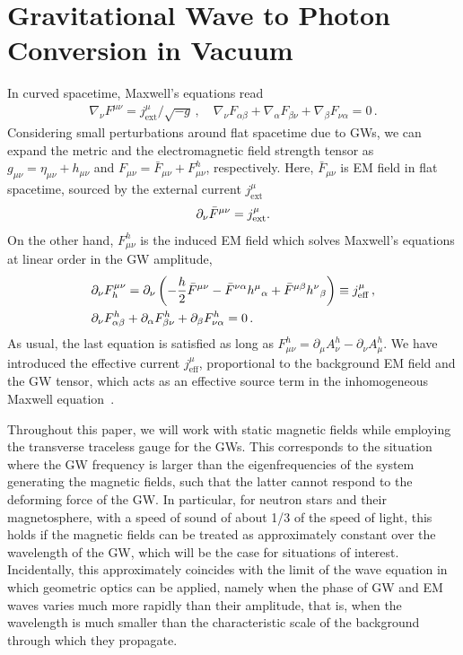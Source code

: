 \documentclass[a4paper,11pt]{article}
\begin{document}
\section{Gravitational Wave to Photon Conversion in Vacuum}
\label{sec:basics}

%
In curved spacetime, Maxwell's equations read~\cite{Landau:1975pou}
%
\begin{align}
 \nabla_{\nu} F^{\mu\nu} = j^\mu_\text{ext} /\sqrt{-g}\,, \quad \nabla_\nu F_{\alpha \beta} + \nabla_\alpha F_{\beta \nu} + \nabla_\beta F_{\nu \alpha} = 0 \,.
\end{align}
%
Considering small perturbations around flat spacetime due to GWs, we can expand the metric and the electromagnetic field strength tensor as $ g_{\mu\nu} = \eta_{\mu\nu} + h_{\mu\nu} $ and $ F_{\mu\nu} = \bar{F}_{\mu\nu} + F^{h}_{\mu\nu} $, respectively.
%
Here, $\bar{F}_{\mu\nu} $ is EM field in flat spacetime, sourced by the external current $j^\mu_\text{ext}$
%
\begin{align}
    \partial_{\nu} \bar{F}^{\mu\nu} = j_{\rm ext}^{\mu}.
\end{align}
%
On the other hand, $F^{h}_{\mu\nu}$ is the induced EM field which solves Maxwell's equations at linear order in the GW amplitude,
%
\begin{equation}
    \begin{aligned}
  & \partial_{\nu} F_{h}^{\mu\nu} = \partial_{\nu} \left( -\frac{h}{2} \bar{F}^{\mu \nu}  - \bar{F}^{\nu \alpha}
 {h^{\mu}}_{\alpha}  +   \bar{F}^{\mu \beta} 
 {h^{\nu}}_{\beta}  \right) \equiv j_{\rm eff}^{\mu} \,, \\
 & \partial_\nu F^h_{\alpha \beta} + \partial_\alpha F^h_{\beta \nu} + \partial_\beta F^h_{\nu \alpha} = 0 \,.
 \label{eq:perturbed_maxwell}
\end{aligned}
\end{equation}
%
As usual, the last equation is satisfied as long as $F^h_{\mu \nu} = \partial_\mu A^h_\nu - \partial_\nu A^h_\mu$.
%
We have introduced the effective current $j_\text{eff}^\mu$, proportional to the background EM field and the GW tensor, which acts as an effective source term in the inhomogeneous Maxwell equation~\cite{Herman:2020wao,Berlin:2021txa,Domcke:2022rgu,Domcke:2023bat}.
%


%
Throughout this paper, we will work with static magnetic fields while employing the transverse traceless gauge for the GWs. 
%
This corresponds to the situation where the GW frequency is larger than the eigenfrequencies of the system generating the magnetic fields, such that the latter cannot respond to the deforming force of the GW.
%
In particular, for neutron stars and their magnetosphere, with a speed of sound of about 1/3 of the speed of light, this holds if the magnetic fields can be treated as approximately constant over the wavelength of the GW, which will be the case for situations of interest.
%
Incidentally, this approximately coincides with the limit of the wave equation in which geometric optics can be applied, namely when the phase of GW and EM waves varies much more rapidly than their amplitude, that is, when the wavelength is much smaller than the characteristic scale of the background through which they propagate.
%
\end{document}
